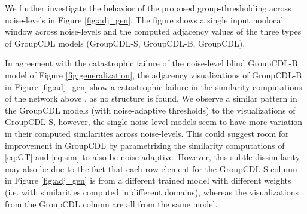 \documentclass[lettersize,journal]{IEEEtran}
\begin{document}
We further investigate the behavior of the proposed group-thresholding across
noise-levels in Figure \ref{fig:adj_gen}. The figure shows a single input nonlocal
window  across noise-levels  and the computed adjacency values of
the three types of GroupCDL models (GroupCDL-S, GroupCDL-B, GroupCDL). 

In agreement with the catastrophic failure of the noise-level blind GroupCDL-B
model of Figure \ref{fig:generalization}, the adjacency visualizations of
GroupCDL-B in Figure \ref{fig:adj_gen} show a catastrophic failure in the
similarity computations of the network above , as no structure is
found. We observe a similar pattern in the
GroupCDL models (with noise-adaptive thresholds) to the visualizations of
GroupCDL-S, however, the single noise-level models seem to have more variation
in their computed similarities across noise-levels.
This could suggest room for improvement in GroupCDL by parametrizing the similarity computations
of \eqref{eq:GT} and \eqref{eq:sim} to also be noise-adaptive. However, this subtle
dissimilarity may also be due to the fact that each row-element for the GroupCDL-S
column in Figure \ref{fig:adj_gen} is from a different trained model with
different weights (i.e. with similarities computed in different domains),
whereas the visualizations from the GroupCDL column are all from the same model.
\end{document}

